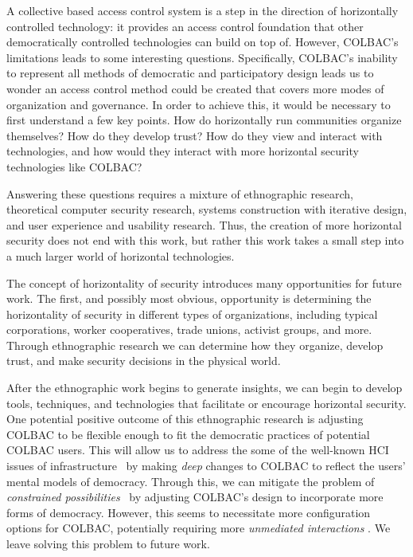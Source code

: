 A collective based access control system is a step in the direction of
horizontally controlled technology: it provides an access control foundation
that other democratically controlled technologies can build on top of. However,
COLBAC's limitations leads to some interesting questions. Specifically, COLBAC's
inability to represent all methods of democratic and participatory design leads
us to wonder an access control method could be created that covers more modes of
organization and governance. In order to achieve this, it would be necessary to
first understand a few key points. How do horizontally run communities organize
themselves? How do they develop trust? How do they view and interact with
technologies, and how would they interact with more horizontal security
technologies like COLBAC?

Answering these questions requires a mixture of ethnographic research,
theoretical computer security research, systems construction with iterative
design, and user experience and usability research. Thus, the creation of more
horizontal security does not end with this work, but rather this work takes a
small step into a much larger world of horizontal technologies.

The concept of horizontality of security introduces many opportunities for
future work. The first, and possibly most obvious, opportunity is determining
the horizontality of security in different types of organizations, including
typical corporations, worker cooperatives, trade unions, activist groups, and
more. Through ethnographic research we can determine how they organize, develop
trust, and make security decisions in the physical world.

After the ethnographic work begins to generate insights, we can begin to develop
tools, techniques, and technologies that facilitate or encourage horizontal
security. One potential positive outcome of this ethnographic research is
adjusting COLBAC to be flexible enough to fit the democratic practices of
potential COLBAC users. This will allow us to address the some of the well-known
HCI issues of infrastructure~\cite{edwards2010infrastructure} by making
\textit{deep} changes to COLBAC to reflect the users' mental models of
democracy. Through this, we can mitigate the problem of \textit{constrained
possibilities}~\cite{edwards2010infrastructure} by adjusting COLBAC's design to
incorporate more forms of democracy. However, this seems to necessitate more
configuration options for COLBAC, potentially requiring more \textit{unmediated
interactions} \cite{edwards2010infrastructure}. We leave solving this problem
to future work.

